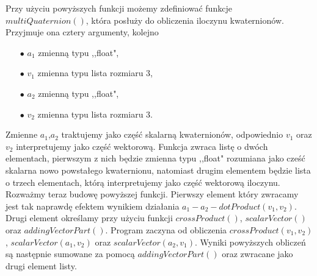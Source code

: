 \documentclass[a4paper,twoside,11pt,reqno]{mwrep}
\theoremstyle{plain} \newtheorem{twr}{Twierdzenie}
\theoremstyle{plain} \newtheorem{lem}{Lemat}
\theoremstyle{definition} \newtheorem{defi}{Definicja}
\theoremstyle{remark} \newtheorem*{wni}{Wniosek}
\theoremstyle{definition} \newtheorem{uwaga}{Uwaga}
\theoremstyle{definition}\newtheorem{prz}{Przykład}
\begin{document}
Przy użyciu powyższych funkcji możemy zdefiniować funkcje $multiQuaternion()$, która posłuży 
do obliczenia iloczynu kwaternionów. Przyjmuje ona cztery argumenty, kolejno 
\begin{itemize}
\item[$\bullet$] $a_1$ zmienną typu ,,float",
\item[$\bullet$] $v_1$ zmienna typu lista rozmiaru $3$,
\item[$\bullet$] $a_2$ zmienną typu ,,float",
\item[$\bullet$] $v_2$ zmienna typu lista rozmiaru $3$.
\end{itemize} 
Zmienne $a_1$,$a_2$ traktujemy jako część skalarną kwaternionów, odpowiednio $v_1$ oraz $v_2$ interpretujemy
jako część wektorową. Funkcja zwraca listę o dwóch elementach, pierwszym z nich będzie
zmienna typu ,,float" rozumiana jako 
cześć skalarna nowo powstałego kwaternionu, natomiast drugim elementem będzie lista o trzech elementach,
którą interpretujemy jako część wektorową iloczynu.
Rozważmy teraz budowę powyższej funkcji. Pierwszy element który zwracamy jest tak naprawdę efektem
wynikiem działania $a_1-a_2 - dotProduct(v_1,v_2)$. Drugi element określamy przy użyciu funkcji
$crossProduct()$, $scalarVector()$ oraz $addingVectorPart()$.
Program zaczyna od obliczenia $crossProduct(v_1,v_2)$, $scalarVector(a_1,v_2)$ oraz $scalarVector(a_2,v_1)$.
Wyniki powyższych obliczeń są następnie sumowane za pomocą $addingVectorPart()$ oraz zwracane jako drugi
element listy.
\end{document}
